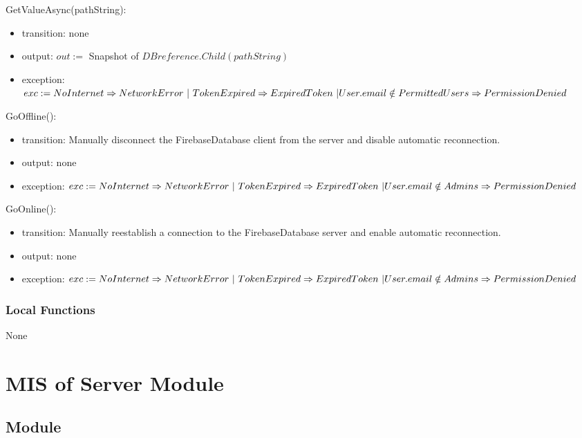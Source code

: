 \documentclass[12pt, titlepage]{article}
\begin{document}
\begin{itemize}
\noindent GetValueAsync(pathString):
\begin{itemize}
\item transition: none
\item output: $out :=$ Snapshot of $DBreference.Child(pathString)$
\item exception: $exc := NoInternet \Rightarrow NetworkError\ | \ TokenExpired \Rightarrow ExpiredToken\ | \\ User.email \notin PermittedUsers \Rightarrow PermissionDenied$
\end{itemize}

\noindent GoOffline():
\begin{itemize}
\item transition: Manually disconnect the FirebaseDatabase client from the server and disable automatic reconnection.
\item output: none
\item exception: $exc := NoInternet \Rightarrow NetworkError\ | \ TokenExpired \Rightarrow ExpiredToken\ | \\ User.email \notin Admins \Rightarrow PermissionDenied$
\end{itemize}

\noindent GoOnline():
\begin{itemize}
\item transition: Manually reestablish a connection to the FirebaseDatabase server and enable automatic reconnection.
\item output: none
\item exception: $exc := NoInternet \Rightarrow NetworkError\ | \ TokenExpired \Rightarrow ExpiredToken\ | \\ User.email \notin Admins \Rightarrow PermissionDenied$
\end{itemize}

\subsubsection{Local Functions}

None

\newpage

\section{MIS of Server Module} \label{mServer}

\subsection{Module}


\end{itemize}
\end{document}
